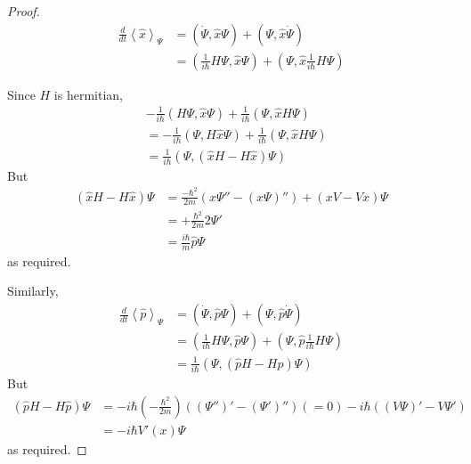 \documentclass[a4paper]{article}
\begin{document}
\begin{proof}
\begin{equation*}
\begin{aligned}
\frac{d}{dt}\left<\hat{x}\right>_\Psi &= \left(\dot{\Psi},\hat{x}\Psi\right) + \left(\Psi,\hat{x}\dot{\Psi}\right)\\
&= \left(\frac{1}{i\hbar} H \Psi, \hat{x}\Psi\right) + \left(\Psi,\hat{x}\frac{1}{i\hbar}H\Psi\right)
\end{aligned}
\end{equation*}

Since $H$ is hermitian,
\begin{equation*}
\begin{aligned}
&-\frac{1}{i\hbar}\left(H\Psi,\hat{x}\Psi\right) + \frac{1}{i\hbar}\left(\Psi,\hat{x}H\Psi\right)\\
&= -\frac{1}{i\hbar}\left(\Psi,H\hat{x}\Psi\right)+\frac{1}{i\hbar}\left(\Psi,\hat{x}H\Psi\right)\\
&= \frac{1}{i\hbar}\left(\Psi,\left(\hat{x}H-H\hat{x}\right)\Psi\right)
\end{aligned}
\end{equation*}
But
\begin{equation*}
\begin{aligned}
\left(\hat{x}H-H\hat{x}\right)\Psi &= \frac{-\hbar^2}{2m}\left(x\Psi'' - \left(x\Psi\right)''\right) + \left(xV-Vx\right)\Psi\\
&= +\frac{\hbar^2}{2m}2\Psi'\\
&= \frac{i\hbar}{m}\hat{p}\Psi
\end{aligned}
\end{equation*}
as required.

Similarly,
\begin{equation*}
\begin{aligned}
\frac{d}{dt}\left<\hat{p}\right>_\Psi &= \left(\dot{\Psi},\hat{p}\Psi\right)+\left(\Psi,\hat{p}\dot{\Psi}\right)\\
&= \left(\frac{1}{i\hbar}H\Psi,\hat{p}\Psi\right) + \left(\Psi,\hat{p}\frac{1}{i\hbar}H\Psi\right)\\
&= \frac{1}{i\hbar}\left(\Psi,\left(\hat{p}H-H\hat{p}\right)\Psi\right)
\end{aligned}
\end{equation*}
But
\begin{equation*}
\begin{aligned}
\left(\hat{p}H-H\hat{p}\right)\Psi &= -i\hbar \left(-\frac{\hbar^2}{2m}\right)\left(\left(\Psi''\right)'-\left(\Psi'\right)''\right) (=0) - i\hbar\left(\left(V\Psi\right)'-V\Psi'\right)\\
&= -i\hbar V'\left(x\right)\Psi
\end{aligned}
\end{equation*}
as required.


\end{proof}
\end{document}
